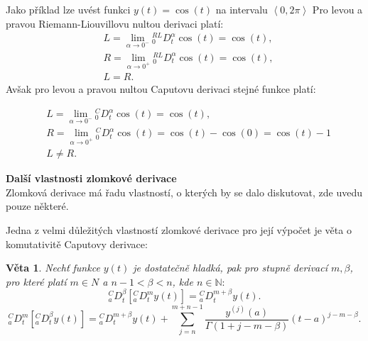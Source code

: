 \documentclass[a4paper,12pt,twoside]{article}
\newtheorem{veta}{Věta}[section]
\theoremstyle{definition}
\theoremstyle{remark}
\numberwithin{equation}{section}
\numberwithin{table}{section}
\numberwithin{figure}{section}
\newcommand{\N}{\mathbb{N}}
\begin{document}
Jako příklad lze uvést funkci $y\left(t\right) =  \cos{\left(t\right)}$ na intervalu $\left\langle 0, 2\pi \right\rangle$ Pro levou a pravou Riemann-Liouvillovu nultou derivaci platí:%
\begin{align}
	&L = \lim\limits_{\alpha \to 0^{-}} {_{0}^{RL}D^{\alpha}_{t}} \cos{\left(t\right)} = \cos{\left(t\right)}, \\
	&R = \lim\limits_{\alpha \to {0}^{+}} {_{0}^{RL}D^{\alpha}_{t}} \cos{\left(t\right)} = \cos{\left(t\right)}, \\
	&L = R.
\end{align}
Avšak pro levou a pravou nultou Caputovu derivaci stejné funkce platí:

\begin{align}
	&L = \lim\limits_{\alpha \to 0^{-}} {_{0}^{C}D^{\alpha}_{t}} \cos{\left(t\right)} = \cos{\left(t\right)}, \\
	&R = \lim\limits_{\alpha \to {0}^{+}} {_{0}^{C}D^{\alpha}_{t}} \cos{\left(t\right)} = \cos{\left(t\right)}  - \cos{\left(0\right)} = \cos{\left(t\right)} - 1 \\
	&L \neq R.
\end{align}

\textbf{Další vlastnosti zlomkové derivace}\\

Zlomková derivace má řadu vlastností, o kterých by se dalo diskutovat, zde uvedu pouze některé.

Jedna z velmi důležitých vlastností zlomkové derivace pro její výpočet je věta o komutativitě Caputovy derivace:

\begin{veta} \label{CaputovaKomutativita}
	Nechť funkce $y\left(t\right)$ je dostatečně hladká, pak pro stupně derivací $m, \beta$, pro které platí $m \in N$ a $n-1 < \beta < n$, kde $n \in \N:$	
	$$
		{_{a}^{C}D^{\beta}_{t}} \left[  {_{a}^{C}D^{m}_{t}} y\left(t\right)\right] = {_{a}^{C}D^{m + \beta}_{t}} y\left(t\right).
	$$
	$$
		{_{a}^{C}D^{m}_{t}} \left[  {_{a}^{C}D^{\beta}_{t}} y\left(t\right)\right] = {_{a}^{C}D^{m + \beta}_{t}} y\left(t\right) + \sum_{j=n}^{m+n-1} \frac{y^{\left(j\right)}\left(a\right)}{\Gamma \left(1+j-m- \beta\right)} \left(t-a\right)^{j-m-\beta}.
	$$
\end{veta}
\end{document}
